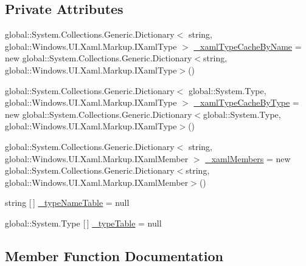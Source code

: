 \subsection*{Private Attributes}
\begin{DoxyCompactItemize}
\item 
global\+::\+System.\+Collections.\+Generic.\+Dictionary$<$ string, global\+::\+Windows.\+U\+I.\+Xaml.\+Markup.\+I\+Xaml\+Type $>$ \hyperlink{class_e_l_i_client_1_1_e_l_i_client___xaml_type_info_1_1_xaml_type_info_provider_a8f626ef2a95a9e870113cc2068ec6bea}{\+\_\+xaml\+Type\+Cache\+By\+Name} = new global\+::\+System.\+Collections.\+Generic.\+Dictionary$<$string, global\+::\+Windows.\+U\+I.\+Xaml.\+Markup.\+I\+Xaml\+Type$>$()
\item 
global\+::\+System.\+Collections.\+Generic.\+Dictionary$<$ global\+::\+System.\+Type, global\+::\+Windows.\+U\+I.\+Xaml.\+Markup.\+I\+Xaml\+Type $>$ \hyperlink{class_e_l_i_client_1_1_e_l_i_client___xaml_type_info_1_1_xaml_type_info_provider_a6cd0f824ae3036446ca977ae7fdaf9af}{\+\_\+xaml\+Type\+Cache\+By\+Type} = new global\+::\+System.\+Collections.\+Generic.\+Dictionary$<$global\+::\+System.\+Type, global\+::\+Windows.\+U\+I.\+Xaml.\+Markup.\+I\+Xaml\+Type$>$()
\item 
global\+::\+System.\+Collections.\+Generic.\+Dictionary$<$ string, global\+::\+Windows.\+U\+I.\+Xaml.\+Markup.\+I\+Xaml\+Member $>$ \hyperlink{class_e_l_i_client_1_1_e_l_i_client___xaml_type_info_1_1_xaml_type_info_provider_a8d6984c71a29b0f497be8c83a05df71c}{\+\_\+xaml\+Members} = new global\+::\+System.\+Collections.\+Generic.\+Dictionary$<$string, global\+::\+Windows.\+U\+I.\+Xaml.\+Markup.\+I\+Xaml\+Member$>$()
\item 
string \mbox{[}$\,$\mbox{]} \hyperlink{class_e_l_i_client_1_1_e_l_i_client___xaml_type_info_1_1_xaml_type_info_provider_a32ff0fcb9474bd0e0ef48da9d06bec58}{\+\_\+type\+Name\+Table} = null
\item 
global\+::\+System.\+Type \mbox{[}$\,$\mbox{]} \hyperlink{class_e_l_i_client_1_1_e_l_i_client___xaml_type_info_1_1_xaml_type_info_provider_a729e5e1f3b1f90684cdbcf91da2058e3}{\+\_\+type\+Table} = null
\end{DoxyCompactItemize}


\subsection{Member Function Documentation}
\mbox{\label{class_e_l_i_client_1_1_e_l_i_client___xaml_type_info_1_1_xaml_type_info_provider_a4f5ed7fa109803ca4e77895515eb3c86}} 
